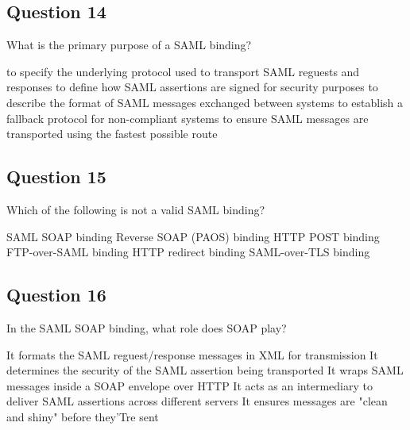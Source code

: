 \subsection*{Question 14}
What is the primary purpose of a SAML binding?
\begin{itemize}
  \correct to specify the underlying protocol used to transport SAML
  reguests and responses
  \incorrect to define how SAML assertions are signed for security purposes
  \incorrect to describe the format of SAML messages exchanged between
  systems
  \incorrect to establish a fallback protocol for non-compliant systems
  \incorrect to ensure SAML messages are transported using the fastest
  possible route
\end{itemize}

\subsection*{Question 15}
Which of the following is not a valid SAML binding?
\begin{itemize}
  \incorrect  SAML SOAP binding
  \incorrect Reverse SOAP (PAOS) binding
  \incorrect  HTTP POST binding
  \correct FTP-over-SAML binding
  \incorrect  HTTP redirect binding
  \correct  SAML-over-TLS binding
\end{itemize}

\subsection*{Question 16}
In the SAML SOAP binding, what role does SOAP play?
\begin{itemize}
  \incorrect  It formats the SAML reguest/response messages in XML for
  transmission
  \incorrect  It determines the security of the SAML assertion being
  transported
  \correct  It wraps SAML messages inside a SOAP envelope over HTTP
  \incorrect  It acts as an intermediary to deliver SAML assertions
  across different servers
  \incorrect  It ensures messages are "clean and shiny" before they'Tre
  sent
\end{itemize}
